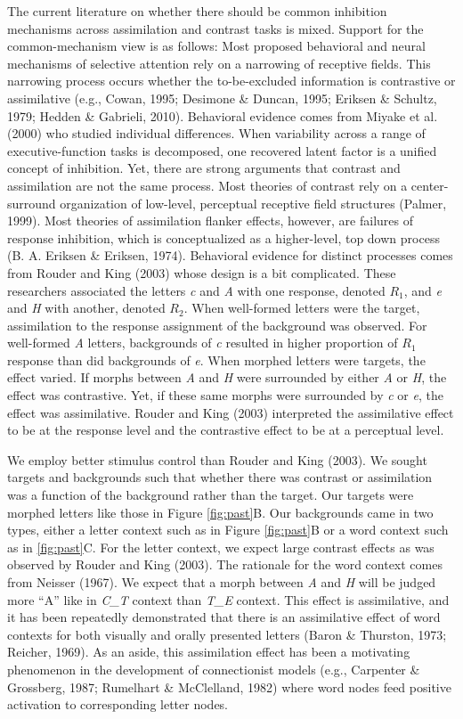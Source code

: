 \documentclass[english,floatsintext,man]{apa6}
\theoremstyle{definition}
\theoremstyle{definition}
\theoremstyle{remark}
\begin{document}
The current literature on whether there should be common inhibition
mechanisms across assimilation and contrast tasks is mixed. Support for
the common-mechanism view is as follows: Most proposed behavioral and
neural mechanisms of selective attention rely on a narrowing of
receptive fields. This narrowing process occurs whether the
to-be-excluded information is contrastive or assimilative (e.g., Cowan,
1995; Desimone \& Duncan, 1995; Eriksen \& Schultz, 1979; Hedden \&
Gabrieli, 2010). Behavioral evidence comes from Miyake et al. (2000) who
studied individual differences. When variability across a range of
executive-function tasks is decomposed, one recovered latent factor is a
unified concept of inhibition. Yet, there are strong arguments that
contrast and assimilation are not the same process. Most theories of
contrast rely on a center-surround organization of low-level, perceptual
receptive field structures (Palmer, 1999). Most theories of assimilation
flanker effects, however, are failures of response inhibition, which is
conceptualized as a higher-level, top down process (B. A. Eriksen \&
Eriksen, 1974). Behavioral evidence for distinct processes comes from
Rouder and King (2003) whose design is a bit complicated. These
researchers associated the letters \emph{c} and \emph{A} with one
response, denoted \(R_1\), and \emph{e} and \emph{H} with another,
denoted \(R_2\). When well-formed letters were the target, assimilation
to the response assignment of the background was observed. For
well-formed \emph{A} letters, backgrounds of \emph{c} resulted in higher
proportion of \(R_1\) response than did backgrounds of \emph{e}. When
morphed letters were targets, the effect varied. If morphs between
\emph{A} and \emph{H} were surrounded by either \emph{A} or \emph{H},
the effect was contrastive. Yet, if these same morphs were surrounded by
\emph{c} or \emph{e}, the effect was assimilative. Rouder and King
(2003) interpreted the assimilative effect to be at the response level
and the contrastive effect to be at a perceptual level.

We employ better stimulus control than Rouder and King (2003). We sought
targets and backgrounds such that whether there was contrast or
assimilation was a function of the background rather than the target.
Our targets were morphed letters like those in Figure \ref{fig:past}B.
Our backgrounds came in two types, either a letter context such as in
Figure \ref{fig:past}B or a word context such as in \ref{fig:past}C. For
the letter context, we expect large contrast effects as was observed by
Rouder and King (2003). The rationale for the word context comes from
Neisser (1967). We expect that a morph between \emph{A} and \emph{H}
will be judged more \enquote{A} like in \emph{C\_T} context than
\emph{T\_E} context. This effect is assimilative, and it has been
repeatedly demonstrated that there is an assimilative effect of word
contexts for both visually and orally presented letters (Baron \&
Thurston, 1973; Reicher, 1969). As an aside, this assimilation effect
has been a motivating phenomenon in the development of connectionist
models (e.g., Carpenter \& Grossberg, 1987; Rumelhart \& McClelland,
1982) where word nodes feed positive activation to corresponding letter
nodes.
\end{document}
